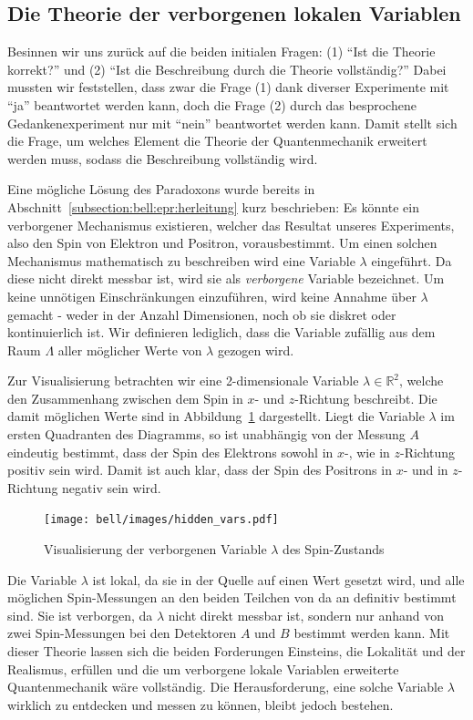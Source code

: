 \begin{refsection}
\subsection{Die Theorie der verborgenen lokalen Variablen\label{subsection:bell:epr:hiddenvars}}
Besinnen wir uns zur\"uck auf die beiden initialen Fragen: 
(1) \enquote{Ist die Theorie korrekt?} und 
(2) \enquote{Ist die Beschreibung durch die Theorie vollst\"andig?}
Dabei mussten wir feststellen, dass zwar die Frage (1) dank diverser
Experimente mit \enquote{ja} beantwortet werden kann, doch die Frage (2) 
durch das besprochene Gedankenexperiment nur mit \enquote{nein} beantwortet
werden kann. 
Damit stellt sich die Frage, um welches Element die Theorie der Quantenmechanik
erweitert werden muss, sodass die Beschreibung vollst\"andig wird.

Eine m\"ogliche L\"osung des Paradoxons wurde bereits in
Abschnitt~\ref{subsection:bell:epr:herleitung} kurz beschrieben:
Es k\"onnte ein verborgener Mechanismus existieren, welcher das Resultat unseres
Experiments, also den Spin von Elektron und Positron, vorausbestimmt.
Um einen solchen Mechanismus mathematisch zu beschreiben wird eine Variable
$\lambda$ eingef\"uhrt.
Da diese nicht direkt messbar ist, wird sie als \emph{verborgene} Variable
bezeichnet.
Um keine unn\"otigen Einschr\"ankungen einzuf\"uhren, wird keine Annahme
\"uber $\lambda$ gemacht - weder in der Anzahl Dimensionen, noch ob sie diskret
oder kontinuierlich ist.
Wir definieren lediglich, dass die Variable zuf\"allig aus dem Raum $\Lambda$ 
aller m\"oglicher Werte von $\lambda$ gezogen wird.

Zur Visualisierung betrachten wir eine 2-dimensionale Variable 
$\lambda\in\mathbb{R}^2$, welche den Zusammenhang zwischen dem Spin in $x$- 
und $z$-Richtung beschreibt.
Die damit m\"oglichen Werte sind in Abbildung~\ref{fig:bell:hidden_var}
dargestellt.
Liegt die Variable $\lambda$ im ersten Quadranten des Diagramms, so ist 
unabh\"angig von der Messung $A$ eindeutig bestimmt, dass der Spin des Elektrons
sowohl in $x$-, wie in $z$-Richtung positiv sein wird.
Damit ist auch klar, dass der Spin des Positrons in $x$- und in $z$-Richtung
negativ sein wird.

\begin{figure}
    \centering
    \texttt{[image: bell/images/hidden\_vars.pdf]}
    \caption{Visualisierung der verborgenen Variable $\lambda$ des Spin-Zustands}
    \label{fig:bell:hidden_var}
\end{figure}

Die Variable $\lambda$ ist lokal, da sie in der Quelle auf einen Wert gesetzt
wird, und alle m\"oglichen Spin-Messungen an den beiden Teilchen von da an
definitiv bestimmt sind.
Sie ist verborgen, da $\lambda$ nicht direkt messbar ist, sondern nur
anhand von zwei Spin-Messungen bei den Detektoren $A$ und $B$ bestimmt werden 
kann.
Mit dieser Theorie lassen sich die beiden Forderungen Einsteins, die Lokalit\"at
und der Realismus, erf\"ullen und die um verborgene lokale Variablen erweiterte
Quantenmechanik w\"are vollst\"andig.
Die Herausforderung, eine solche Variable $\lambda$ wirklich zu entdecken und
messen zu k\"onnen, bleibt jedoch bestehen.


\end{refsection}
